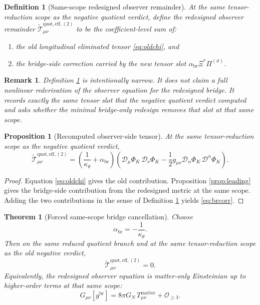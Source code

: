 \documentclass[11pt]{article}
\newcommand{\Dperp}{\mathcal D}
\newcommand{\ReEffAux}{\widetilde{\mathcal T}_{\mu\nu}^{\mathrm{quot,eff},(2)}}
\newcommand{\PiTheta}{\Pi^{(\vartheta)}}
\newtheorem{definition}{Definition}
\newtheorem{proposition}{Proposition}
\newtheorem{remark}{Remark}
\newtheorem{theorem}{Theorem}
\begin{document}
\begin{definition}[Same-scope redesigned observer remainder]
\label{def:reteff}
At the same tensor-reduction scope as the negative quotient verdict, define the \emph{redesigned observer remainder} \(\ReEffAux\) to be the coefficient-level sum of:
\begin{enumerate}
    \item the old longitudinal eliminated tensor \eqref{eq:oldchi}, and
    \item the bridge-side correction carried by the new tensor slot \(\alpha_{\mathrm{br}}\Xi^\ast\PiTheta\).
\end{enumerate}
\end{definition}

\begin{remark}
Definition \ref{def:reteff} is intentionally narrow. It does not claim a full nonlinear rederivation of the observer equation for the redesigned bridge. It records exactly the same tensor slot that the negative quotient verdict computed and asks whether the minimal bridge-only redesign removes that slot at that same scope.
\end{remark}

\begin{proposition}[Recomputed observer-side tensor]
\label{prop:newtensor}
At the same tensor-reduction scope as the negative quotient verdict,
\begin{equation}
\ReEffAux
=
\left(\frac{1}{\kappa_\theta}+\alpha_{\mathrm{br}}\right)
\left(
\Dperp_\mu\Phi_K\,\Dperp_\nu\Phi_K
-\frac12 g_{\mu\nu}\Dperp_\alpha\Phi_K\,\Dperp^\alpha\Phi_K
\right).
\label{eq:brcorr}
\end{equation}
\end{proposition}

\begin{proof}
Equation \eqref{eq:oldchi} gives the old contribution. Proposition \ref{prop:leading} gives the bridge-side contribution from the redesigned metric at the same scope. Adding the two contributions in the sense of Definition \ref{def:reteff} yields \eqref{eq:brcorr}.
\end{proof}

\begin{theorem}[Forced same-scope bridge cancellation]
\label{thm:cancel}
Choose
\begin{equation}
\alpha_{\mathrm{br}}=-\frac{1}{\kappa_\theta}.
\label{eq:alphachoice}
\end{equation}
Then on the same reduced quotient branch and at the same tensor-reduction scope as the old negative verdict,
\begin{equation}
\ReEffAux=0.
\label{eq:cancellation}
\end{equation}
Equivalently, the redesigned observer equation is matter-only Einsteinian up to higher-order terms at that same scope:
\begin{equation}
G_{\mu\nu}[g^{\mathrm{br}}]
=
8\pi G_N\,T_{\mu\nu}^{\mathrm{matter}}
+ \mathcal O_{\ge 3}.
\label{eq:newobserver}
\end{equation}
\end{theorem}
\end{document}
